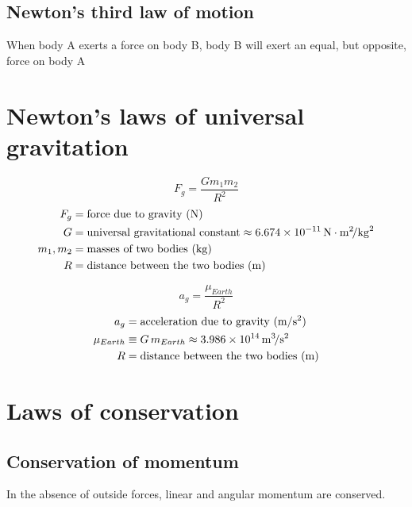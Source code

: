 \documentclass{article}
\begin{document}
\subsection{Newton's third law of motion}
When body A exerts a force on body B, body B will exert an equal, but opposite, force on body A

\section{Newton's laws of universal gravitation}
\begin{multicols}{3}

	\begin{equation*}
	\boxed{F_{g} = \dfrac{Gm_{1}m_{2}}{R^{2}}}
	\end{equation*}
	\vfill\null
	\columnbreak
	\begin{align*}
	F_{g} &= \text{force due to gravity (\si{\newton})}\\
	G &= \text{universal gravitational constant} \approx
	  6.674 \times 10^{-11}\,\si{\newton \meter\squared\per\kilo\gram\squared}\\
	m_{1}, m_{2} &= \text{masses of two bodies  (\si{\kilo\gram})}\\
	R &= \text{distance between the two bodies  (\si{\meter})}\\
	\end{align*}
\end{multicols}
\begin{multicols}{3}
	\begin{equation*}
	\boxed{a_{g} = \dfrac{\mu_{Earth}}{R^{2}}}
	\end{equation*}
	\vfill\null
	\columnbreak
	\begin{align*}
	a_{g} &= \text{acceleration due to gravity (\si{\meter\per\second\squared})}\\
	\mu_{Earth} &\equiv G\,m_{Earth} \approx 3.986 \times 10^{14} \, \si{\meter\cubed\per\second\squared}\\
	R &= \text{distance between the two bodies  (\si{\meter})}\\
	\end{align*}

	\vfill\null
\end{multicols}

\section{Laws of conservation}
\subsection{Conservation of momentum}
In the absence of outside forces, linear and angular momentum are conserved.
\end{document}
